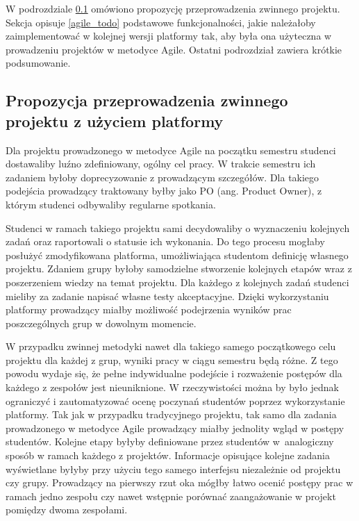W podrozdziale \ref{agile_proposition} omówiono propozycję przeprowadzenia zwinnego projektu.
Sekcja opisuje \ref{agile_todo} podstawowe funkcjonalności, jakie należałoby zaimplementować w kolejnej wersji platformy tak, aby była ona użyteczna w prowadzeniu projektów w metodyce Agile.
Ostatni podrozdział zawiera krótkie podsumowanie.

\subsection{Propozycja przeprowadzenia zwinnego projektu z użyciem platformy}
\label{agile_proposition}

Dla projektu prowadzonego w metodyce Agile na początku semestru studenci dostawaliby luźno zdefiniowany, ogólny cel pracy.
W trakcie semestru ich zadaniem byłoby doprecyzowanie z prowadzącym szczegółów.
Dla takiego podejścia prowadzący traktowany byłby jako PO (ang. Product Owner), z którym studenci odbywaliby regularne spotkania.

Studenci w ramach takiego projektu sami decydowaliby o wyznaczeniu kolejnych zadań oraz raportowali o statusie ich wykonania.
Do tego procesu mogłaby posłużyć zmodyfikowana platforma, umożliwiająca studentom definicję własnego projektu.
Zdaniem grupy byłoby samodzielne stworzenie kolejnych etapów wraz z poszerzeniem wiedzy na temat projektu.
Dla każdego z kolejnych zadań studenci mieliby za zadanie napisać własne testy akceptacyjne.
Dzięki wykorzystaniu platformy prowadzący miałby możliwość podejrzenia wyników prac poszczególnych grup w dowolnym momencie.

W przypadku zwinnej metodyki nawet dla takiego samego początkowego celu projektu dla każdej z grup, wyniki pracy w ciągu semestru będą różne.
Z tego powodu wydaje się, że pełne indywidualne podejście i rozważenie postępów dla każdego z zespołów jest nieuniknione.
W rzeczywistości można by było jednak ograniczyć i zautomatyzować ocenę poczynań studentów poprzez wykorzystanie platformy.
Tak jak w przypadku tradycyjnego projektu, tak samo dla zadania prowadzonego w metodyce Agile prowadzący miałby jednolity wgląd w postępy studentów.
Kolejne etapy byłyby definiowane przez studentów w~analogiczny sposób w ramach każdego z projektów.
Informacje opisujące kolejne zadania wyświetlane byłyby przy użyciu tego samego interfejsu niezależnie od projektu czy grupy.
Prowadzący na pierwszy rzut oka mógłby łatwo ocenić postępy prac w ramach jedno zespołu czy nawet wstępnie porównać zaangażowanie w projekt pomiędzy dwoma zespołami.

